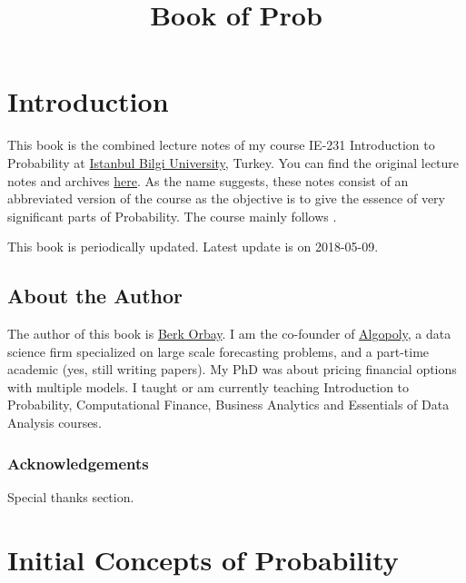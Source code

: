 \documentclass[]{book}
\title{Book of Prob}
\author{}
\date{}
\theoremstyle{definition}
\theoremstyle{definition}
\theoremstyle{definition}
\theoremstyle{remark}
\begin{document}
\maketitle

{
\setcounter{tocdepth}{1}
\tableofcontents
}
\hypertarget{introduction}{%
\chapter*{Introduction}\label{introduction}}

This book is the combined lecture notes of my course IE-231 Introduction
to Probability at \href{https://www.bilgi.edu.tr}{Istanbul Bilgi
University}, Turkey. You can find the original lecture notes and
archives \href{https://berkorbay.github.io/bilgi-ie231/}{here}. As the
name suggests, these notes consist of an abbreviated version of the
course as the objective is to give the essence of very significant parts
of Probability. The course mainly follows \citep{myers2012}.

This book is periodically updated. Latest update is on 2018-05-09.

\hypertarget{about-the-author}{%
\section*{About the Author}\label{about-the-author}}

The author of this book is \href{http://berkorbay.me}{Berk Orbay}. I am
the co-founder of \href{http://algopoly.com}{Algopoly}, a data science
firm specialized on large scale forecasting problems, and a part-time
academic (yes, still writing papers). My PhD was about pricing financial
options with multiple models. I taught or am currently teaching
Introduction to Probability, Computational Finance, Business Analytics
and Essentials of Data Analysis courses.

\hypertarget{acknowledgements}{%
\subsection*{Acknowledgements}\label{acknowledgements}}

Special thanks section.

\hypertarget{intro}{%
\chapter{Initial Concepts of Probability}\label{intro}}
\end{document}
